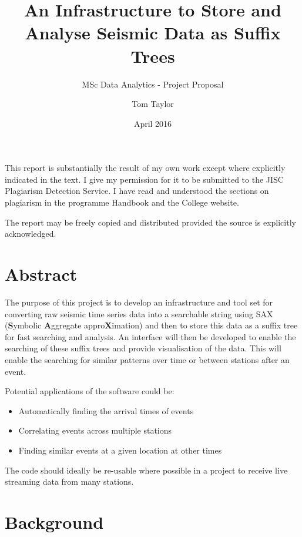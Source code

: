 \documentclass[11pt, a4paper]{scrartcl}
\title{\vspace{-3.0cm}An Infrastructure to Store and Analyse Seismic Data as Suffix Trees}
\subtitle{MSc Data Analytics - Project Proposal}
\date{April 2016}
\author{Tom Taylor}
\begin{document}
\maketitle
\begin{itshape}
	\noindent This report is substantially the result of my own work except where explicitly indicated in the text. I give my permission for it to be submitted to the JISC Plagiarism Detection Service. I have read and understood the sections on plagiarism in the programme Handbook and the College website.
	
	\noindent The report may be freely copied and distributed provided the source is explicitly acknowledged.
\end{itshape}

\tableofcontents

\newpage

\section{Abstract}
	The purpose of this project is to develop an infrastructure and tool set for converting raw seismic time series data into a searchable string using SAX (\textbf{S}ymbolic \textbf{A}ggregate appro\textbf{X}imation) and then to store this data as a suffix tree for fast searching and analysis.  An interface will then be developed to enable the searching of these suffix trees and provide visualisation of the data.  This will enable the searching for similar patterns over time or between stations after an event.
	
	\noindent Potential applications of the software could be:
	\begin{itemize}
		\item Automatically finding the arrival times of events
		\item Correlating events across multiple stations
		\item Finding similar events at a given location at other times
	\end{itemize}
	
	The code should ideally be re-usable where possible in a project to receive live streaming data from many stations.
	
\section{Background}
\end{document}
